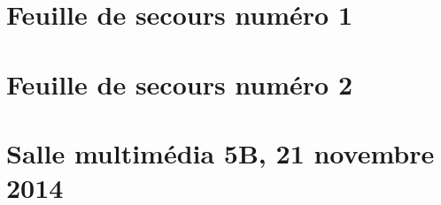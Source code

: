 \section{Feuille de secours numéro 1}



\section{Feuille de secours numéro 2}



\section{Salle multimédia 5B, 21 novembre 2014}


